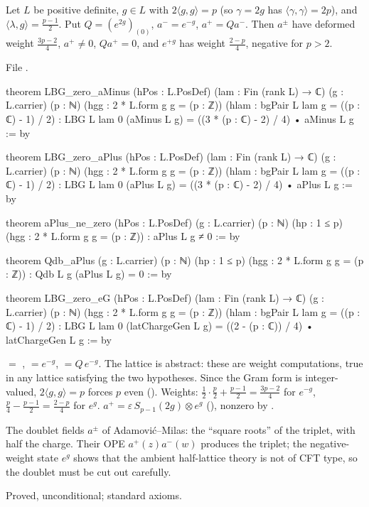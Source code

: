 \begin{theorem}\label{l18:thm:doubletgens}
Let $L$ be positive definite, $g\in L$ with $2\langle g,g\rangle=p$ (so $\gamma=2g$ has $\langle\gamma,\gamma\rangle=2p$), and
$\langle\lambda,g\rangle=\frac{p-1}2$. Put $Q=(e^{2g})_{(0)}$, $a^-=e^{-g}$, $a^+=Qa^-$. Then $a^\pm$ have deformed weight
$\frac{3p-2}4$, $a^+\ne0$, $Qa^+=0$, and $e^{+g}$ has weight $\frac{2-p}4$, negative for $p>2$.
\end{theorem}
\noindent File .
\begin{leancode}
theorem LBG_zero_aMinus (hPos : L.PosDef) (lam : Fin (rank L) → ℂ) (g : L.carrier) (p : ℕ)
    (hgg : 2 * L.form g g = (p : ℤ)) (hlam : bgPair L lam g = ((p : ℂ) - 1) / 2) :
    LBG L lam 0 (aMinus L g) = ((3 * (p : ℂ) - 2) / 4) • aMinus L g := by

theorem LBG_zero_aPlus (hPos : L.PosDef) (lam : Fin (rank L) → ℂ) (g : L.carrier) (p : ℕ)
    (hgg : 2 * L.form g g = (p : ℤ)) (hlam : bgPair L lam g = ((p : ℂ) - 1) / 2) :
    LBG L lam 0 (aPlus L g) = ((3 * (p : ℂ) - 2) / 4) • aPlus L g := by

theorem aPlus_ne_zero (hPos : L.PosDef) (g : L.carrier) (p : ℕ) (hp : 1 ≤ p)
    (hgg : 2 * L.form g g = (p : ℤ)) : aPlus L g ≠ 0 := by

theorem Qdb_aPlus (g : L.carrier) (p : ℕ) (hp : 1 ≤ p) (hgg : 2 * L.form g g = (p : ℤ)) :
    Qdb L g (aPlus L g) = 0 := by

theorem LBG_zero_eG (hPos : L.PosDef) (lam : Fin (rank L) → ℂ) (g : L.carrier) (p : ℕ)
    (hgg : 2 * L.form g g = (p : ℤ)) (hlam : bgPair L lam g = ((p : ℂ) - 1) / 2) :
    LBG L lam 0 (latChargeGen L g) = ((2 - (p : ℂ)) / 4) • latChargeGen L g := by
\end{leancode}
\begin{dictionary}
 $=$ ,  $=e^{-g}$,  $=Q\,e^{-g}$. The lattice is
abstract: these are weight computations, true in any lattice satisfying the two hypotheses. Since the Gram form is
integer-valued, $2\langle g,g\rangle=p$ forces $p$ even (). Weights: $\frac12\cdot\frac p2+\frac{p-1}2=\frac{3p-2}4$ for $e^{-g}$,
$\frac p4-\frac{p-1}2=\frac{2-p}4$ for $e^{g}$. $a^+=\varepsilon\,S_{p-1}(2g)\otimes e^{g}$ (), nonzero by
.
\end{dictionary}
\begin{physics}
The doublet fields $a^\pm$ of Adamovi\'c--Milas: the ``square roots'' of the triplet, with half the charge.
Their OPE $a^+(z)a^-(w)$ produces the triplet; the negative-weight state $e^{g}$ shows that the ambient half-lattice
theory is not of CFT type, so the doublet must be cut out carefully.
\end{physics}
\begin{status}
Proved, unconditional; standard axioms.
\end{status}

